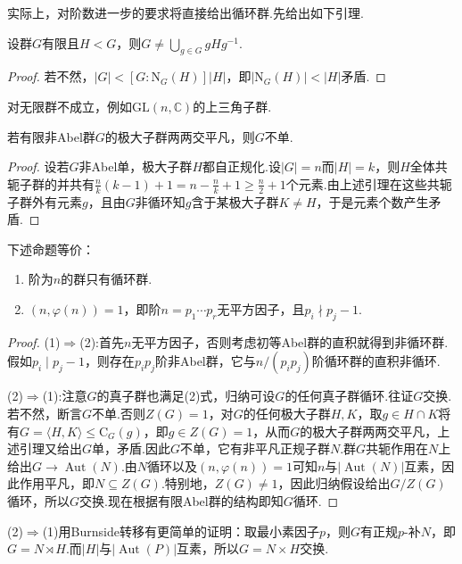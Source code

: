 实际上，对阶数进一步的要求将直接给出循环群.先给出如下引理.
\begin{lemma}
	设群$G$有限且$H<G$，则$\displaystyle G\ne\bigcup_{g\in G}gHg^{-1}$.
\end{lemma}
\begin{proof}
	若不然，$|G|<[G:\mathrm{N}_G(H)]|H|$，即$|\mathrm{N}_G(H)|<|H|$矛盾.
\end{proof}
\begin{remark}
	对无限群不成立，例如$\mathrm{GL}(n,\mathbb{C})$的上三角子群.
\end{remark}
\begin{lemma*}
	若有限非Abel群$G$的极大子群两两交平凡，则$G$不单.
\end{lemma*}
\begin{proof}
	设若$G$非Abel单，极大子群$H$都自正规化.设$|G|=n$而$|H|=k$，则$H$全体共轭子群的并共有$\frac{n}{k}(k-1)+1=n-\frac{n}{k}+1\ge \frac{n}{2}+1$个元素.由上述引理在这些共轭子群外有元素$g$，且由$G$非循环知$g$含于某极大子群$K\ne H$，于是元素个数产生矛盾.
\end{proof}

\begin{thm}
	下述命题等价：\hypertarget{thm:CyclicFromOrder}{}
	\begin{enumerate}
		\item 阶为$n$的群只有循环群.
		\item $(n,\varphi(n))=1$，即阶$n=p_1\cdots p_r$无平方因子，且$p_i\nmid p_j-1$.
	\end{enumerate}
\end{thm}
\begin{proof}
	\hspace*{5.2pt}(1)$\Rightarrow$(2):首先$n$无平方因子，否则考虑初等Abel群的直积就得到非循环群.假如$p_i\mid p_j-1$，则存在$p_ip_j$阶非Abel群，它与$n/(p_ip_j)$阶循环群的直积非循环.

	(2)$\Rightarrow$(1):注意$G$的真子群也满足(2)式，归纳可设$G$的任何真子群循环.往证$G$交换.若不然，断言$G$不单.否则$Z(G)=1$，对$G$的任何极大子群$H,K$，取$g\in H\cap K$将有$G=\langle H,K\rangle\le\mathrm{C}_G(g)$，即$g\in Z(G)=1$，从而$G$的极大子群两两交平凡，上述引理又给出$G$单，矛盾.因此$G$不单，它有非平凡正规子群$N$.群$G$共轭作用在$N$上给出$G\to\operatorname*{Aut}(N)$.由$N$循环以及$(n,\varphi(n))=1$可知$n$与$|\operatorname*{Aut}(N)|$互素，因此作用平凡，即$N\subseteq Z(G)$.特别地，$Z(G)\ne 1$，因此归纳假设给出$G/Z(G)$循环，所以$G$交换.现在根据有限Abel群的结构即知$G$循环.
\end{proof}
\begin{remark}
	(2)$\Rightarrow$(1)用Burnside转移有更简单的证明：取最小素因子$p$，则$G$有正规$p$-补$N$，即$G=N\rtimes H$.而$|H|$与$|\operatorname*{Aut}(P)|$互素，所以$G=N\times H$交换.
\end{remark}

